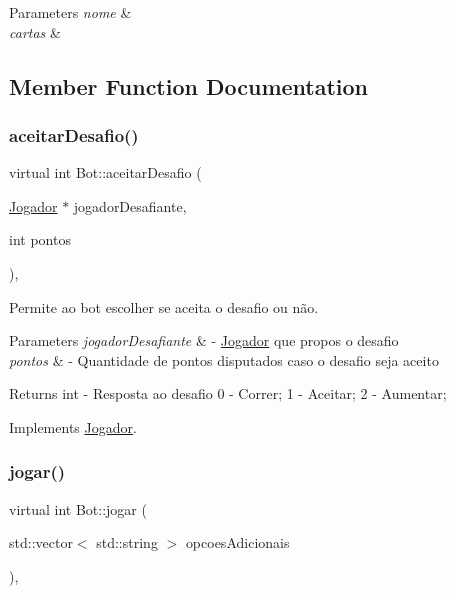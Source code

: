 \begin{DoxyParams}{Parameters}
{\em nome} & \\
\hline
{\em cartas} & \\
\hline
\end{DoxyParams}


\subsection{Member Function Documentation}
\mbox{\label{class_bot_a203bfaaa13441296a94dd157fc253631}} 
\subsubsection{\texorpdfstring{aceitarDesafio()}{aceitarDesafio()}}
{\footnotesize\ttfamily virtual int Bot\+::aceitar\+Desafio (\begin{DoxyParamCaption}\item[{\mbox{\hyperlink{class_jogador}{Jogador}} $\ast$}]{jogador\+Desafiante,  }\item[{int}]{pontos }\end{DoxyParamCaption})\hspace{0.3cm}{\ttfamily [override]}, {\ttfamily [virtual]}}



Permite ao bot escolher se aceita o desafio ou não. 


\begin{DoxyParams}{Parameters}
{\em jogador\+Desafiante} & -\/ \mbox{\hyperlink{class_jogador}{Jogador}} que propos o desafio \\
\hline
{\em pontos} & -\/ Quantidade de pontos disputados caso o desafio seja aceito \\
\hline
\end{DoxyParams}
\begin{DoxyReturn}{Returns}
int -\/ Resposta ao desafio 0 -\/ Correr; 1 -\/ Aceitar; 2 -\/ Aumentar; 
\end{DoxyReturn}


Implements \mbox{\hyperlink{class_jogador}{Jogador}}.

\mbox{\label{class_bot_ab3d1a1563bada68fef705b2ca0af6386}} 
\subsubsection{\texorpdfstring{jogar()}{jogar()}}
{\footnotesize\ttfamily virtual int Bot\+::jogar (\begin{DoxyParamCaption}\item[{std\+::vector$<$ std\+::string $>$}]{opcoes\+Adicionais }\end{DoxyParamCaption})\hspace{0.3cm}{\ttfamily [override]}, {\ttfamily [virtual]}}



